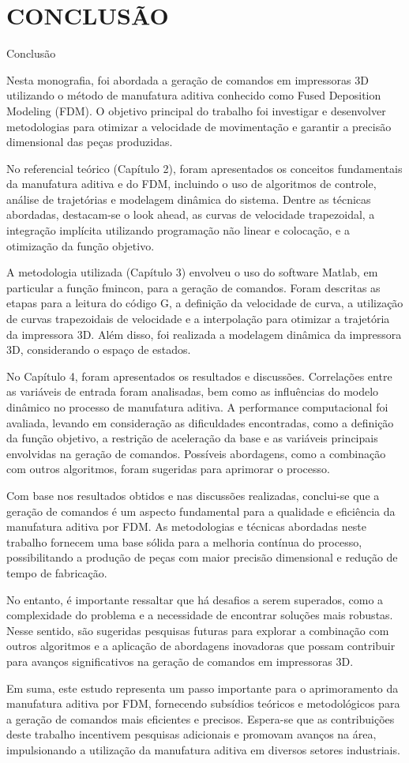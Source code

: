 \chapter{CONCLUSÃO}
Conclusão

Nesta monografia, foi abordada a geração de comandos em impressoras 3D utilizando o método de manufatura aditiva conhecido como Fused Deposition Modeling (FDM). O objetivo principal do trabalho foi investigar e desenvolver metodologias para otimizar a velocidade de movimentação e garantir a precisão dimensional das peças produzidas.

No referencial teórico (Capítulo 2), foram apresentados os conceitos fundamentais da manufatura aditiva e do FDM, incluindo o uso de algoritmos de controle, análise de trajetórias e modelagem dinâmica do sistema. Dentre as técnicas abordadas, destacam-se o look ahead, as curvas de velocidade trapezoidal, a integração implícita utilizando programação não linear e colocação, e a otimização da função objetivo.

A metodologia utilizada (Capítulo 3) envolveu o uso do software Matlab, em particular a função fmincon, para a geração de comandos. Foram descritas as etapas para a leitura do código G, a definição da velocidade de curva, a utilização de curvas trapezoidais de velocidade e a interpolação para otimizar a trajetória da impressora 3D. Além disso, foi realizada a modelagem dinâmica da impressora 3D, considerando o espaço de estados.

No Capítulo 4, foram apresentados os resultados e discussões. Correlações entre as variáveis de entrada foram analisadas, bem como as influências do modelo dinâmico no processo de manufatura aditiva. A performance computacional foi avaliada, levando em consideração as dificuldades encontradas, como a definição da função objetivo, a restrição de aceleração da base e as variáveis principais envolvidas na geração de comandos. Possíveis abordagens, como a combinação com outros algoritmos, foram sugeridas para aprimorar o processo.

Com base nos resultados obtidos e nas discussões realizadas, conclui-se que a geração de comandos é um aspecto fundamental para a qualidade e eficiência da manufatura aditiva por FDM. As metodologias e técnicas abordadas neste trabalho fornecem uma base sólida para a melhoria contínua do processo, possibilitando a produção de peças com maior precisão dimensional e redução de tempo de fabricação.

No entanto, é importante ressaltar que há desafios a serem superados, como a complexidade do problema e a necessidade de encontrar soluções mais robustas. Nesse sentido, são sugeridas pesquisas futuras para explorar a combinação com outros algoritmos e a aplicação de abordagens inovadoras que possam contribuir para avanços significativos na geração de comandos em impressoras 3D.

Em suma, este estudo representa um passo importante para o aprimoramento da manufatura aditiva por FDM, fornecendo subsídios teóricos e metodológicos para a geração de comandos mais eficientes e precisos. Espera-se que as contribuições deste trabalho incentivem pesquisas adicionais e promovam avanços na área, impulsionando a utilização da manufatura aditiva em diversos setores industriais.
